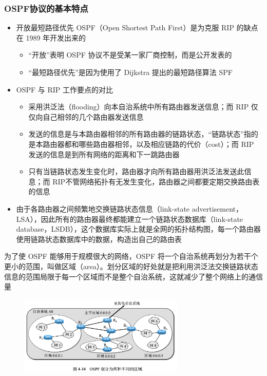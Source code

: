 \documentclass[cs4size,a4paper,10pt]{ctexart}
\begin{document}
	\subsubsection{OSPF协议的基本特点}
	\begin{itemize}
		\item 开放最短路径优先 OSPF（Open Shortest Path First）是为克服 RIP 的缺点在 1989 年开发出来的
		\begin{itemize}
			\item “开放”表明 OSPF 协议不是受某一家厂商控制，而是公开发表的
			\item “最短路径优先”是因为使用了 Dijkstra 提出的最短路径算法 SPF
		\end{itemize}
		\item OSPF 与 RIP 工作要点的对比
		\begin{itemize}
			\item 采用洪泛法（flooding）向本自治系统中所有路由器发送信息；而 RIP 仅仅向自己相邻的几个路由器发送信息
			\item 发送的信息是与本路由器相邻的所有路由器的链路状态，“链路状态”指的是本路由器都和哪些路由器相邻，以及相应链路的代价（cost）；而 RIP 发送的信息是到所有网络的距离和下一跳路由器
			\item 只有当链路状态发生变化时，路由器才向所有路由器用洪泛法发送此信息；而 RIP不管网络拓扑有无发生变化，路由器之间都要定期交换路由表的信息
		\end{itemize}
		\item 由于各路由器之间频繁地交换链路状态信息（link-state advertisement，LSA），因此所有的路由器最终都能建立一个链路状态数据库（link-state database，LSDB），这个数据库实际上就是全网的拓扑结构图，每一个路由器使用链路状态数据库中的数据，构造出自己的路由表
	\end{itemize}

	为了使 OSPF 能够用于规模很大的网络，OSPF 将一个自治系统再划分为若干个更小的范围，叫做区域（area）。划分区域的好处就是把利用洪泛法交换链路状态信息的范围局限于每一个区域而不是整个自治系统，这就减少了整个网络上的通信量

	\begin{figure}[H]
		\centering
		\includegraphics[width=0.7\textwidth]{img/4.34}
	\end{figure}
\end{document}
